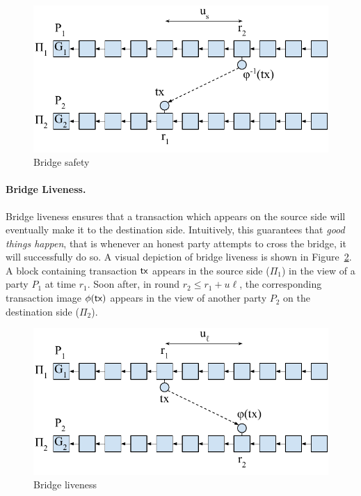 \begin{figure}
    \center
    \includegraphics[width=0.8\columnwidth]{figures/bridge-safety.pdf}
    \caption{Bridge safety}
    \label{fig:bridge-safety}
\end{figure}

\paragraph{Bridge Liveness.}
Bridge liveness ensures that a transaction which appears on the source side will eventually make
it to the destination side. Intuitively, this guarantees that \emph{good things happen}, that is whenever an
honest party attempts to cross the bridge, it will successfully do so.
A visual depiction of bridge liveness is shown in Figure~\ref{fig:bridge-liveness}.
A block containing transaction $\textsf{tx}$ appears in the source side ($\Pi_1$) in the view
of a party $P_1$ at time $r_1$. Soon after, in round $r_2 \leq r_1 + u\ell$, the corresponding transaction image
$\phi(\textsf{tx})$ appears in the view of another party $P_2$ on the destination side ($\Pi_2$).

\begin{figure}
    \center
    \includegraphics[width=0.7\columnwidth]{figures/bridge-liveness.pdf}
    \caption{Bridge liveness}
    \label{fig:bridge-liveness}
\end{figure}

